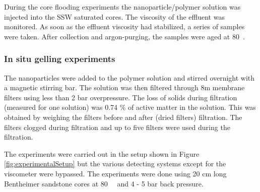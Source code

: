 \documentclass[nanomaterials,article,submit,moreauthors,pdftex]{Definitions/mdpi}
\begin{document}
During the core flooding experiments the nanoparticle/polymer solution was injected into the SSW saturated cores. The viscosity of the effluent was monitored. As soon as the effluent viscosity had stabilized, a series of samples were taken. After collection and argon-purging, the samples were aged at 80~\celsius. 

\subsubsection{In situ gelling experiments}

The nanoparticles were added to the polymer solution and stirred overnight with a magnetic stirring bar. The solution was then filtered through 8\micro m membrane filters using less than 2 bar overpressure. The loss of solids during filtration (measured for one solution) was 0.74 \% of active matter in the solution. This was obtained by weighing the filters before and after (dried filters) filtration. The filters clogged during filtration and up to five filters were used during the filtration.

The experiments were carried out in the setup shown in Figure \ref{fig:experimentalSetup} but the various detecting systems except for the viscometer were bypassed. The experiments were done using 20 cm long Bentheimer sandstone cores at 80~\celsius~ and 4 - 5 bar back pressure.
\end{document}
